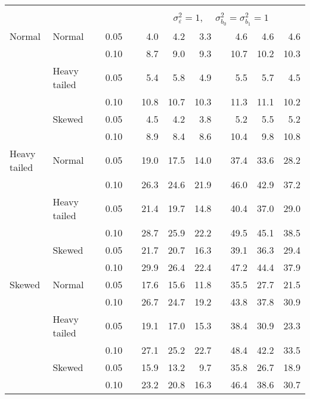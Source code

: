 \begin{table}[ht]
\begin{scriptsize}
\begin{center}
\begin{tabular}{ll p{.1cm} c p{.1cm} rrr p{.1cm} rrr}
&&&&&&&&&&&\\
& && && \multicolumn{7}{c}{$\sigma_{\varepsilon}^2 = 1$, \ \ $\sigma_{b_0}^2 = \sigma_{b_1}^2 = 1$} \\ \cline{6-12}
Normal       & Normal       && 0.05 &&   4.0 & 4.2 & 3.3 &   & 4.6 & 4.6 & 4.6 \\ 
             &              && 0.10 &&   8.7 & 9.0 & 9.3 &   & 10.7 & 10.2 & 10.3 \\ 
             & Heavy tailed && 0.05 &&   5.4 & 5.8 & 4.9 &   & 5.5 & 5.7 & 4.5 \\ 
             &              && 0.10 &&   10.8 & 10.7 & 10.3 &   & 11.3 & 11.1 & 10.2 \\ 
             & Skewed       && 0.05 &&   4.5 & 4.2 & 3.8 &   & 5.2 & 5.5 & 5.2 \\ 
             &              && 0.10 &&   8.9 & 8.4 & 8.6 &   & 10.4 & 9.8 & 10.8 \\ 
Heavy tailed & Normal       && 0.05 &&   19.0 & 17.5 & 14.0 &   & 37.4 & 33.6 & 28.2 \\ 
             &              && 0.10 &&   26.3 & 24.6 & 21.9 &   & 46.0 & 42.9 & 37.2 \\ 
             & Heavy tailed && 0.05 &&   21.4 & 19.7 & 14.8 &   & 40.4 & 37.0 & 29.0 \\ 
             &              && 0.10 &&   28.7 & 25.9 & 22.2 &   & 49.5 & 45.1 & 38.5 \\ 
             & Skewed       && 0.05 &&   21.7 & 20.7 & 16.3 &   & 39.1 & 36.3 & 29.4 \\ 
             &              && 0.10 &&   29.9 & 26.4 & 22.4 &   & 47.2 & 44.4 & 37.9 \\ 
Skewed       & Normal       && 0.05 &&   17.6 & 15.6 & 11.8 &   & 35.5 & 27.7 & 21.5 \\ 
             &              && 0.10 &&   26.7 & 24.7 & 19.2 &   & 43.8 & 37.8 & 30.9 \\ 
             & Heavy tailed && 0.05 &&   19.1 & 17.0 & 15.3 &   & 38.4 & 30.9 & 23.3 \\ 
             &              && 0.10 &&   27.1 & 25.2 & 22.7 &   & 48.4 & 42.2 & 33.5 \\ 
             & Skewed       && 0.05 &&   15.9 & 13.2 & 9.7 &   & 35.8 & 26.7 & 18.9 \\ 
             &              && 0.10 &&   23.2 & 20.8 & 16.3 &   & 46.4 & 38.6 & 30.7 \\ 


\end{tabular}
\end{center}
\end{scriptsize}
\end{table}
